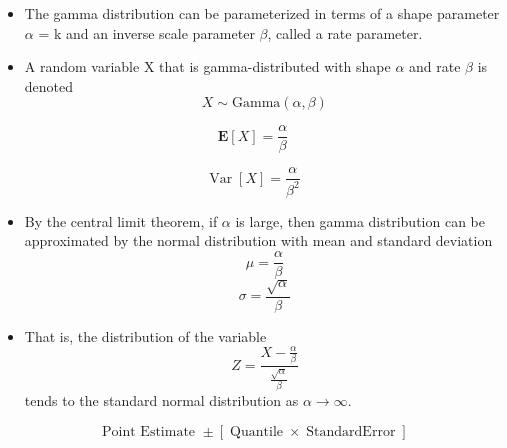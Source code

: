\documentclass[]{article}
\begin{document}
\begin{itemize}
\item The gamma distribution can be parameterized in terms of a shape parameter $\alpha$ = k and an inverse scale parameter $\beta$, called a rate parameter.
\item A random variable X that is gamma-distributed with shape $\alpha$ and rate $\beta$ is denoted
\[
X \sim  \textrm{Gamma}(\alpha,\beta)
\]
\end{itemize}

{
\LARGE
\[\scriptstyle\mathbf{E}[ X] = \frac{\alpha}{\beta}\]
}

{
\LARGE
\[
\scriptstyle \operatorname{Var}[ X] = \frac{\alpha}{\beta^2}
\]
}
\bigskip
\begin{itemize}
\item
By the central limit theorem, if $\alpha$ is large, then gamma distribution can be approximated by the normal distribution with mean and standard deviation\[\mu = \frac{\alpha}{\beta}\] 
 \[\sigma=\frac{\sqrt{\alpha}}{\beta}\]


\item That is, the distribution of the variable  
{
\LARGE
\[Z=\frac{X-\frac{\alpha}{\beta}}{\frac{\sqrt{\alpha}}{\beta}}\]} tends to the standard normal distribution as $ \alpha \longrightarrow \infty$.
\end{itemize}
\newpage
{
\Huge
\[
\scriptstyle \mbox{ Point Estimate } \pm  \left[ \operatorname{ Quantile } \times \operatorname{Standard Error } 
 \right] 
\]}
\end{document}

